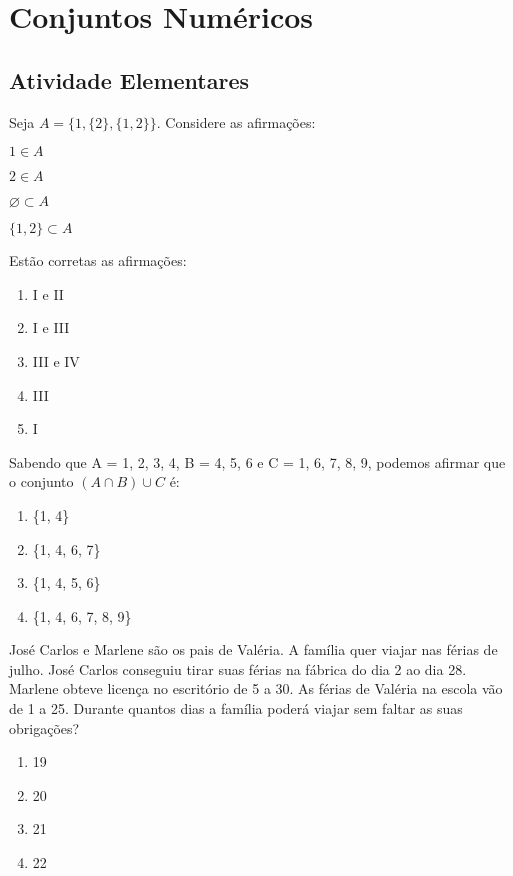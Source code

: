 \chapter{Conjuntos Numéricos}
\section{Atividade Elementares}
	
	\item Seja $A = \{ 1, \{2\}, \{1,2\} \}$. Considere as afirmações:
		\begin{multicols}{4}
		\begin{list}{ -}{}
			\item $1 \displaystyle \in A$
			\item $2 \displaystyle \in A$
			\item $\displaystyle \varnothing \subset A$
			\item $\{1,2\} \displaystyle \subset A$
		\end{list}
		\end{multicols}
		Estão corretas as afirmações:
		\begin{multicols}{5}
		\begin{enumerate}
			\item I e II
			\item I e III
			\item III e IV	
			\item III
			\item I
		\end{enumerate}
		\end{multicols}

		\item Sabendo que A = {1, 2, 3, 4}, B = {4, 5, 6} e C = {1, 6, 7, 8, 9}, podemos afirmar que o conjunto $(A \displaystyle \cap B) \displaystyle \cup C$ é:
		\begin{multicols}{4}
		\begin{enumerate}
			\item \{1, 4\}
			\item \{1, 4, 6, 7\}
			\item \{1, 4, 5, 6\}	
			\item \{1, 4, 6, 7, 8, 9\}			
		\end{enumerate}
		\end{multicols}

		\item José Carlos e Marlene são os pais de Valéria. A família quer viajar nas férias de julho. José Carlos conseguiu tirar suas férias na fábrica do dia 2 ao dia 28. Marlene obteve licença no escritório de 5 a 30. As férias de Valéria na escola vão de 1 a 25. Durante quantos dias a família poderá viajar sem faltar as suas obrigações?
		\begin{multicols}{4}
		\begin{enumerate}
			\item 19
			\item 20
			\item 21 	
			\item  22			
		\end{enumerate}
		\end{multicols}

